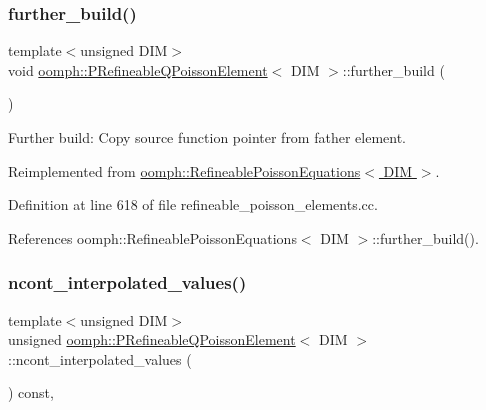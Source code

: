 \mbox{\label{classoomph_1_1PRefineableQPoissonElement_a953633adeb9bc3875113d3672c7d525f}} 
\subsubsection{\texorpdfstring{further\+\_\+build()}{further\_build()}}
{\footnotesize\ttfamily template$<$unsigned D\+IM$>$ \\
void \hyperlink{classoomph_1_1PRefineableQPoissonElement}{oomph\+::\+P\+Refineable\+Q\+Poisson\+Element}$<$ D\+IM $>$\+::further\+\_\+build (\begin{DoxyParamCaption}{ }\end{DoxyParamCaption})\hspace{0.3cm}{\ttfamily [virtual]}}



Further build\+: Copy source function pointer from father element. 



Reimplemented from \hyperlink{classoomph_1_1RefineablePoissonEquations_adb5a117ca7556e66af8f3eeaf0bbee7a}{oomph\+::\+Refineable\+Poisson\+Equations$<$ D\+I\+M $>$}.



Definition at line 618 of file refineable\+\_\+poisson\+\_\+elements.\+cc.



References oomph\+::\+Refineable\+Poisson\+Equations$<$ D\+I\+M $>$\+::further\+\_\+build().

\mbox{\label{classoomph_1_1PRefineableQPoissonElement_a1841e8c6ebcea0efc212a871e03dec24}} 
\subsubsection{\texorpdfstring{ncont\+\_\+interpolated\+\_\+values()}{ncont\_interpolated\_values()}}
{\footnotesize\ttfamily template$<$unsigned D\+IM$>$ \\
unsigned \hyperlink{classoomph_1_1PRefineableQPoissonElement}{oomph\+::\+P\+Refineable\+Q\+Poisson\+Element}$<$ D\+IM $>$\+::ncont\+\_\+interpolated\+\_\+values (\begin{DoxyParamCaption}{ }\end{DoxyParamCaption}) const\hspace{0.3cm}{\ttfamily [inline]}, {\ttfamily [virtual]}}



